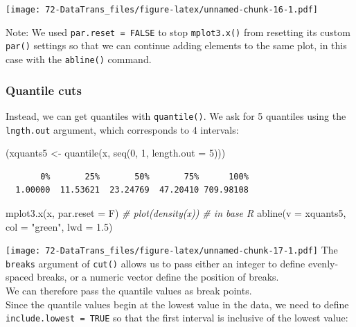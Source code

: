 \documentclass[
]{book}
\newenvironment{Shaded}{\begin{snugshade}}{\end{snugshade}}
\newcommand{\AttributeTok}[1]{\textcolor[rgb]{0.77,0.63,0.00}{#1}}
\newcommand{\CommentTok}[1]{\textcolor[rgb]{0.56,0.35,0.01}{\textit{#1}}}
\newcommand{\DecValTok}[1]{\textcolor[rgb]{0.00,0.00,0.81}{#1}}
\newcommand{\FloatTok}[1]{\textcolor[rgb]{0.00,0.00,0.81}{#1}}
\newcommand{\FunctionTok}[1]{\textcolor[rgb]{0.00,0.00,0.00}{#1}}
\newcommand{\NormalTok}[1]{#1}
\newcommand{\OtherTok}[1]{\textcolor[rgb]{0.56,0.35,0.01}{#1}}
\newcommand{\StringTok}[1]{\textcolor[rgb]{0.31,0.60,0.02}{#1}}
\begin{document}
\texttt{[image: 72-DataTrans\_files/figure-latex/unnamed-chunk-16-1.pdf]}

Note: We used \texttt{par.reset\ =\ FALSE} to stop \texttt{mplot3.x()} from resetting its custom \texttt{par()} settings so that we can continue adding elements to the same plot, in this case with the \texttt{abline()} command.

\hypertarget{quantile-cuts}{%
\subsubsection{Quantile cuts}\label{quantile-cuts}}

Instead, we can get quantiles with \texttt{quantile()}. We ask for 5 quantiles using the \texttt{lngth.out} argument, which corresponds to 4 intervals:

\begin{Shaded}
\begin{Highlighting}[]
\NormalTok{(xquants5 }\OtherTok{\textless{}{-}} \FunctionTok{quantile}\NormalTok{(x, }\FunctionTok{seq}\NormalTok{(}\DecValTok{0}\NormalTok{, }\DecValTok{1}\NormalTok{, }\AttributeTok{length.out =} \DecValTok{5}\NormalTok{)))}
\end{Highlighting}
\end{Shaded}

\begin{verbatim}
       0%       25%       50%       75%      100% 
  1.00000  11.53621  23.24769  47.20410 709.98108 
\end{verbatim}

\begin{Shaded}
\begin{Highlighting}[]
\FunctionTok{mplot3.x}\NormalTok{(x, }\AttributeTok{par.reset =}\NormalTok{ F)}
\CommentTok{\# plot(density(x)) \# in base R}
\FunctionTok{abline}\NormalTok{(}\AttributeTok{v =}\NormalTok{ xquants5, }\AttributeTok{col =} \StringTok{"green"}\NormalTok{, }\AttributeTok{lwd =} \FloatTok{1.5}\NormalTok{)}
\end{Highlighting}
\end{Shaded}

\texttt{[image: 72-DataTrans\_files/figure-latex/unnamed-chunk-17-1.pdf]}
The \texttt{breaks} argument of \texttt{cut()} allows us to pass either an integer to define evenly-spaced breaks, or a numeric vector define the position of breaks.\\
We can therefore pass the quantile values as break points.\\
Since the quantile values begin at the lowest value in the data, we need to define \texttt{include.lowest\ =\ TRUE} so that the first interval is inclusive of the lowest value:
\end{document}

